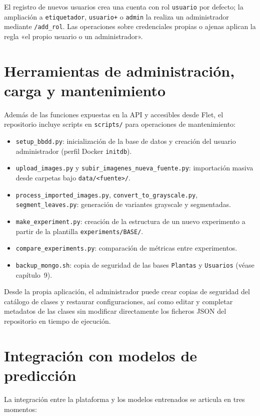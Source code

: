 \documentclass[11pt,spanish,listoffigures,listoftables]{tfgetsinf}
\begin{document}
El registro de nuevos usuarios crea una cuenta con rol \texttt{usuario} por defecto; la ampliación a \texttt{etiquetador}, \texttt{usuario+} o \texttt{admin} la realiza un administrador mediante \texttt{/add\_rol}. Las operaciones sobre credenciales propias o ajenas aplican la regla «el propio usuario o un administrador».

\section{Herramientas de administración, carga y mantenimiento}

Además de las funciones expuestas en la API y accesibles desde Flet, el repositorio incluye scripts en \texttt{scripts/} para operaciones de mantenimiento:

\begin{itemize}
    \item \texttt{setup\_bbdd.py}: inicialización de la base de datos y creación del usuario administrador (perfil Docker \texttt{initdb}).
    \item \texttt{upload\_images.py} y \texttt{subir\_imagenes\_nueva\_fuente.py}: importación masiva desde carpetas bajo \texttt{data/<fuente>/}.
    \item \texttt{process\_imported\_images.py}, \texttt{convert\_to\_grayscale.py}, \texttt{segment\_leaves.py}: generación de variantes grayscale y segmentadas.
    \item \texttt{make\_experiment.py}: creación de la estructura de un nuevo experimento a partir de la plantilla \texttt{experiments/BASE/}.
    \item \texttt{compare\_experiments.py}: comparación de métricas entre experimentos.
    \item \texttt{backup\_mongo.sh}: copia de seguridad de las bases \texttt{Plantas} y \texttt{Usuarios} (véase capítulo~9).
\end{itemize}

Desde la propia aplicación, el administrador puede crear copias de seguridad del catálogo de clases y restaurar configuraciones, así como editar y completar metadatos de las clases sin modificar directamente los ficheros JSON del repositorio en tiempo de ejecución.

\section{Integración con modelos de predicción}

La integración entre la plataforma y los modelos entrenados se articula en tres momentos:
\end{document}
